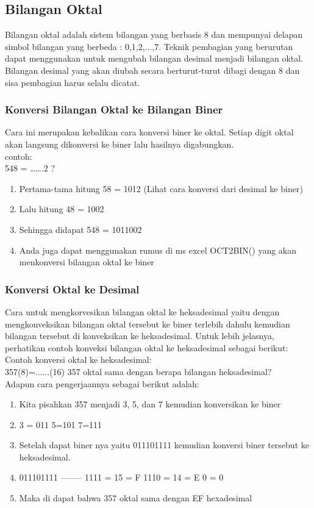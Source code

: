 \subsection{Bilangan Oktal}
Bilangan oktal adalah sistem bilangan yang berbasis 8 dan mempunyai delapan simbol bilangan yang berbeda : 0,1,2,...,7.
Teknik pembagian yang berurutan dapat menggunakan untuk mengubah bilangan desimal menjadi bilangan oktal. Bilangan desimal yang akan diubah secara berturut-turut dibagi dengan 8 dan sisa pembagian harus selalu dicatat. 
\subsubsection{Konversi Bilangan Oktal ke Bilangan Biner}
Cara ini merupakan kebalikan cara konversi biner ke oktal. Setiap digit oktal akan langsung dikonversi ke biner lalu hasilnya digabungkan.
\\contoh:
\\548 = …….2 ?
\\
\begin{enumerate}
\item Pertama-tama hitung 58 = 1012 (Lihat cara konversi dari desimal ke biner)
\item Lalu hitung 48 = 1002
\item Sehingga didapat 548 = 1011002
\item Anda juga dapat menggunakan rumus di ms excel OCT2BIN() yang akan menkonversi bilangan oktal ke biner
\end{enumerate}

\subsubsection{Konversi Oktal ke Desimal}
Cara untuk mengkorvesikan bilangan oktal ke heksadesimal yaitu dengan mengkonveksikan bilangan oktal tersebut ke biner terlebih dahulu kemudian bilangan tersebut di konveksikan ke heksadesimal. Untuk lebih jelasnya, perhatikan contoh konveksi bilangan oktal ke heksadesimal sebagai berikut:
\\ Contoh konversi oktal ke heksadesimal:
\\357(8)=......(16) 357 oktal sama dengan berapa bilangan heksadesimal?
\\Adapun cara pengerjaannya sebagai berikut adalah:
\begin{enumerate}
\item Kita pisahkan 357 menjadi 3, 5, dan 7 kemudian konversikan ke biner 
\item 3 = 011 5=101 7=111
\item Setelah dapat biner nya yaitu 011101111 kemudian konversi biner tersebut ke heksadesimal. 
\item 011101111 -------- 1111 = 15 = F 1110 = 14 = E 0 = 0
\item Maka di dapat bahwa 357 oktal sama dengan EF hexadesimal 
\end{enumerate}


